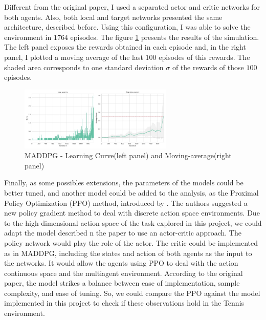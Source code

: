 \documentclass[a4paper]{article}
\begin{document}

Different from the original paper, I used a separated actor and critic networks for both agents. Also, both local and target networks presented the same architecture, described before. Using this configuration, I was able to solve the environment in $1764$ episodes. The figure \ref{fig:ddpg} presents the results of the simulation. The left panel exposes the rewards obtained in each episode and, in the right panel, I plotted a moving average of the last $100$ episodes of this rewards. The shaded area corresponds to one standard deviation $\sigma$ of the rewards of those $100$ episodes.

\begin{figure}[ht]
\centering
\includegraphics[width=0.65\textwidth]{../notebooks/figures/2018-11-07-MADDPG-learning-curve.jpg}
\caption{MADDPG - Learning Curve(left panel) and Moving-average(right panel)}
\label{fig:ddpg}
\end{figure}

Finally, as some possibles extensions, the parameters of the models could be better tuned, and another model could be added to the analysis, as the Proximal Policy Optimization (PPO) method, introduced by \cite{Schulman:2017vq}. The authors suggested a new policy gradient method to deal with discrete action space environments. Due to the high-dimensional action space of the task explored in this project, we could adapt the model described n the paper to use an actor-critic approach. The policy network would play the role of the actor. The critic could be implemented as in MADDPG, including the states and action of both agents as the input to the networks. It would allow the agents using PPO to deal with the action continuous space and the multiagent environment. According to the original paper, the model strikes a balance between ease of implementation, sample complexity, and ease of tuning. So, we could compare the PPO against the model implemented in this project to check if these observations hold in the Tennis environment.









\end{document}

